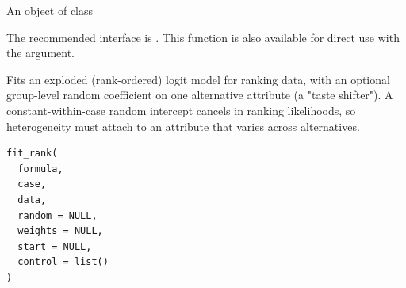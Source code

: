 \documentclass[a4paper]{book}
\begin{document}
%
\begin{Value}
An object of class 
\end{Value}
%
\begin{Note}
The recommended interface is .
This function is also available for direct use with the  argument.
\end{Note}
%
\begin{Examples}
\end{Examples}
%
\begin{Description}
Fits an exploded (rank-ordered) logit model for ranking data, with an
optional group-level random coefficient on one alternative attribute
(a "taste shifter"). A constant-within-case random intercept cancels in
ranking likelihoods, so heterogeneity must attach to an attribute that
varies across alternatives.
\end{Description}
%
\begin{Usage}
\begin{verbatim}
fit_rank(
  formula,
  case,
  data,
  random = NULL,
  weights = NULL,
  start = NULL,
  control = list()
)
\end{verbatim}
\end{Usage}
%
\end{document}
